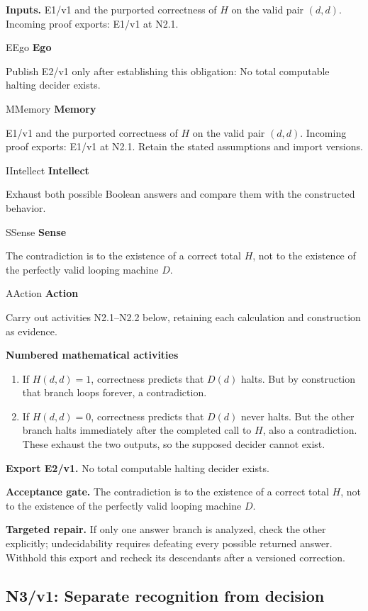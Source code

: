 \documentclass[preprint,12pt,aps,pra,showkeys,amsmath,amssymb,superscriptaddress,floatfix]{revtex4-2}
\theoremstyle{definition}
\theoremstyle{remark}
\newcommand{\mmfaculty}[3]{%
 \begin{mmfacultybox}{#1}{#2}
 {\sffamily\bfseries\color{MMBlue}#2}\par\smallskip #3
 \end{mmfacultybox}}
\newcommand{\field}[2]{\par\smallskip\noindent\textbf{#1.} #2\par}
\begin{document}
\field{Inputs}{E1/v1 and the purported correctness of \(H\) on the valid pair
\((d,d)\). Incoming proof exports: E1/v1 at N2.1.}

\mmfaculty{E}{Ego}{Publish E2/v1 only after establishing this obligation: No total
computable halting decider exists.}

\mmfaculty{M}{Memory}{E1/v1 and the purported correctness of \(H\) on the valid pair
\((d,d)\). Incoming proof exports: E1/v1 at N2.1. Retain the stated
assumptions and import versions.}

\mmfaculty{I}{Intellect}{Exhaust both possible Boolean answers and compare them with the
constructed behavior.}

\mmfaculty{S}{Sense}{The contradiction is to the existence of a correct total \(H\), not to
the existence of the perfectly valid looping machine \(D\).}

\mmfaculty{A}{Action}{Carry out activities N2.1--N2.2 below, retaining each calculation and
construction as evidence.}

\smallskip\noindent\textbf{Numbered mathematical activities}

\begin{enumerate}[label=N2.\arabic*,leftmargin=3.4em]

\item If \(H(d,d)=1\), correctness predicts that \(D(d)\) halts. But by
construction that branch loops forever, a contradiction.

\item If \(H(d,d)=0\), correctness predicts that \(D(d)\) never halts. But the
other branch halts immediately after the completed call to \(H\), also a
contradiction. These exhaust the two outputs, so the supposed decider
cannot exist.

\end{enumerate}

\field{Export E2/v1}{No total computable halting decider exists.}

\field{Acceptance gate}{The contradiction is to the existence of a correct total \(H\), not to
the existence of the perfectly valid looping machine \(D\).}

\field{Targeted repair}{If only one answer branch is analyzed, check the other explicitly;
undecidability requires defeating every possible returned answer.
Withhold this export and recheck its descendants after a versioned
correction.}

\clearpage

\subsection{N3/v1: Separate recognition from decision}
\end{document}
